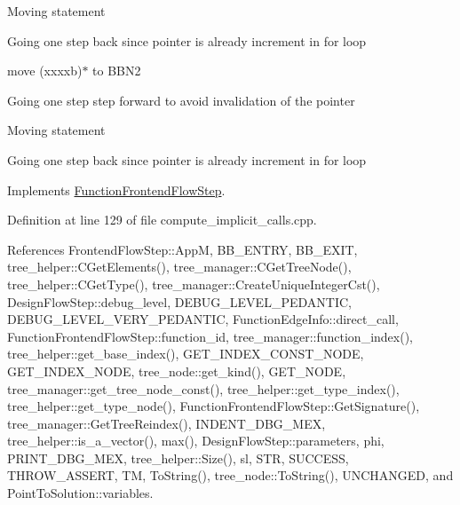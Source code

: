Moving statement

Going one step back since pointer is already increment in for loop

move (xxxxb)$\ast$ to B\+B\+N2

Going one step step forward to avoid invalidation of the pointer

Moving statement

Going one step back since pointer is already increment in for loop 

Implements \hyperlink{classFunctionFrontendFlowStep_a00612f7fb9eabbbc8ee7e39d34e5ac68}{Function\+Frontend\+Flow\+Step}.



Definition at line 129 of file compute\+\_\+implicit\+\_\+calls.\+cpp.



References Frontend\+Flow\+Step\+::\+AppM, B\+B\+\_\+\+E\+N\+T\+RY, B\+B\+\_\+\+E\+X\+IT, tree\+\_\+helper\+::\+C\+Get\+Elements(), tree\+\_\+manager\+::\+C\+Get\+Tree\+Node(), tree\+\_\+helper\+::\+C\+Get\+Type(), tree\+\_\+manager\+::\+Create\+Unique\+Integer\+Cst(), Design\+Flow\+Step\+::debug\+\_\+level, D\+E\+B\+U\+G\+\_\+\+L\+E\+V\+E\+L\+\_\+\+P\+E\+D\+A\+N\+T\+IC, D\+E\+B\+U\+G\+\_\+\+L\+E\+V\+E\+L\+\_\+\+V\+E\+R\+Y\+\_\+\+P\+E\+D\+A\+N\+T\+IC, Function\+Edge\+Info\+::direct\+\_\+call, Function\+Frontend\+Flow\+Step\+::function\+\_\+id, tree\+\_\+manager\+::function\+\_\+index(), tree\+\_\+helper\+::get\+\_\+base\+\_\+index(), G\+E\+T\+\_\+\+I\+N\+D\+E\+X\+\_\+\+C\+O\+N\+S\+T\+\_\+\+N\+O\+DE, G\+E\+T\+\_\+\+I\+N\+D\+E\+X\+\_\+\+N\+O\+DE, tree\+\_\+node\+::get\+\_\+kind(), G\+E\+T\+\_\+\+N\+O\+DE, tree\+\_\+manager\+::get\+\_\+tree\+\_\+node\+\_\+const(), tree\+\_\+helper\+::get\+\_\+type\+\_\+index(), tree\+\_\+helper\+::get\+\_\+type\+\_\+node(), Function\+Frontend\+Flow\+Step\+::\+Get\+Signature(), tree\+\_\+manager\+::\+Get\+Tree\+Reindex(), I\+N\+D\+E\+N\+T\+\_\+\+D\+B\+G\+\_\+\+M\+EX, tree\+\_\+helper\+::is\+\_\+a\+\_\+vector(), max(), Design\+Flow\+Step\+::parameters, phi, P\+R\+I\+N\+T\+\_\+\+D\+B\+G\+\_\+\+M\+EX, tree\+\_\+helper\+::\+Size(), sl, S\+TR, S\+U\+C\+C\+E\+SS, T\+H\+R\+O\+W\+\_\+\+A\+S\+S\+E\+RT, TM, To\+String(), tree\+\_\+node\+::\+To\+String(), U\+N\+C\+H\+A\+N\+G\+ED, and Point\+To\+Solution\+::variables.

